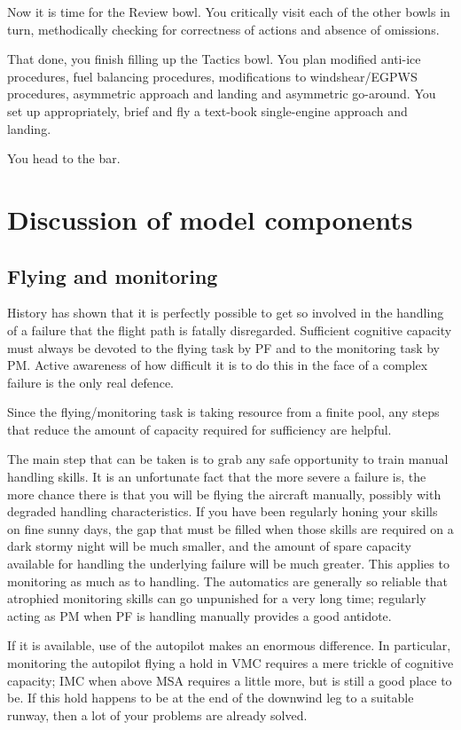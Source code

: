 \documentclass[a5paper,11pt,titlepage]{article}
\begin{document}
Now it is time for the Review bowl. You critically visit each of the
other bowls in turn, methodically checking for correctness of actions
and absence of omissions.

That done, you finish filling up the Tactics bowl. You plan modified
anti-ice procedures, fuel balancing procedures, modifications to
windshear/EGPWS procedures, asymmetric approach and landing and
asymmetric go-around. You set up appropriately, brief and fly a text-book
single-engine approach and landing.

You head to the bar.

\section{Discussion of model components}

\subsection{Flying and monitoring}

History has shown that it is perfectly possible to get so involved in
the handling of a failure that the flight path is fatally
disregarded. Sufficient cognitive capacity must always be devoted to
the flying task by PF and to the monitoring task by PM. Active awareness
of how difficult it is to do this in the face of a complex failure is
the only real defence.

Since the flying/monitoring task is taking resource from a finite pool,
any steps that reduce the amount of capacity required for sufficiency
are helpful.

The main step that can be taken is to grab any safe opportunity to train
manual handling skills. It is an unfortunate fact that the more severe a
failure is, the more chance there is that you will be flying the
aircraft manually, possibly with degraded handling characteristics. If
you have been regularly honing your skills on fine sunny days, the gap
that must be filled when those skills are required on a dark stormy
night will be much smaller, and the amount of spare capacity available
for handling the underlying failure will be much greater. This applies
to monitoring as much as to handling. The automatics are generally so
reliable that atrophied monitoring skills can go unpunished for a very
long time; regularly acting as PM when PF is handling manually provides
a good antidote.

If it is available, use of the autopilot makes an enormous
difference. In particular, monitoring the autopilot flying a hold in VMC
requires a mere trickle of cognitive capacity; IMC when above MSA
requires a little more, but is still a good place to be. If this hold
happens to be at the end of the downwind leg to a suitable runway, then
a lot of your problems are already solved.
\end{document}
